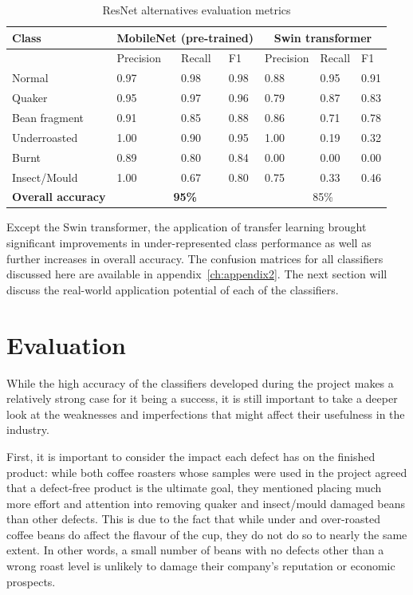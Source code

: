 \begin{table}[h]
    \centering
    \begin{tabular}{*7l}
        \toprule
        \textbf{Class} & \multicolumn{3}{c}{MobileNet (pre-trained)} & \multicolumn{3}{c}{Swin transformer} \\
        \midrule
        {}            & Precision & Recall & F1   & Precision & Recall & F1   \\
        Normal        & 0.97      & 0.98   & 0.98 & 0.88      & 0.95   & 0.91 \\
        Quaker        & 0.95      & 0.97   & 0.96 & 0.79      & 0.87   & 0.83 \\
        Bean fragment & 0.91      & 0.85   & 0.88 & 0.86      & 0.71   & 0.78 \\
        Underroasted  & 1.00      & 0.90   & 0.95 & 1.00      & 0.19   & 0.32 \\
        Burnt         & 0.89      & 0.80   & 0.84 & 0.00      & 0.00   & 0.00 \\
        Insect/Mould  & 1.00      & 0.67   & 0.80 & 0.75      & 0.33   & 0.46 \\
        \midrule
        \textbf{Overall accuracy} & \multicolumn{3}{c}{\textbf{95\%}} & \multicolumn{3}{c}{85\%} \\
        \bottomrule
    \end{tabular}
    \caption{ResNet alternatives evaluation metrics}
    \label{tab:transfer-results-2}
\end{table}
Except the Swin transformer, the application of transfer learning brought significant improvements in
under-represented class performance as well as further increases in overall accuracy.
The confusion matrices for all classifiers discussed here are available in appendix~\ref{ch:appendix2}.
The next section will discuss the real-world application potential of each of the classifiers.

\section{Evaluation}
\label{sec:evaluation}
While the high accuracy of the classifiers developed during the project makes a relatively strong case for it being a success,
it is still important to take a deeper look at the weaknesses and imperfections that might affect their usefulness in the industry.

First, it is important to consider the impact each defect has on the finished product: while both coffee roasters whose
samples were used in the project agreed that a defect-free product is the ultimate goal, they mentioned placing much more
effort and attention into removing quaker and insect/mould damaged beans than other defects.
This is due to the fact that while under and over-roasted coffee beans do affect the flavour of the cup, they do not
do so to nearly the same extent.
In other words, a small number of beans with no defects other than a wrong roast level is unlikely to damage their company's
reputation or economic prospects.

